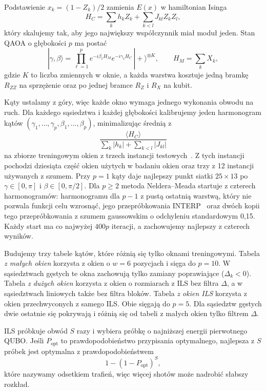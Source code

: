 \documentclass[runningheads]{llncs}
\begin{document}
Podstawienie $x_k = (1 - Z_k)/2$ zamienia $E(x)$ w hamiltonian Isinga
\begin{equation}
  H_C = \sum_k h_k Z_k + \sum_{k<l} J_{kl} Z_k Z_l ,
\end{equation}
który skalujemy tak,
aby jego największy współczynnik miał moduł jeden. Stan QAOA o głębokości
$p$ ma postać
\begin{equation}
  |\gamma,\beta\rangle = \prod_{\ell=1}^{p}
  e^{-i\beta_\ell H_M} e^{-i\gamma_\ell H_C} \, |{+}\rangle^{\otimes K},
  \qquad H_M = \sum_k X_k ,
\end{equation}
gdzie $K$ to liczba zmiennych w oknie, a każda warstwa kosztuje jedną bramkę
$R_{ZZ}$ na sprzężenie oraz po jednej bramce $R_Z$ i $R_X$ na kubit.

Kąty ustalamy z góry, więc każde okno wymaga jednego wykonania obwodu na
ruch. Dla każdego sąsiedztwa i każdej głębokości kalibrujemy jeden
harmonogram kątów $(\gamma_1, \dots, \gamma_p, \beta_1, \dots, \beta_p)$,
minimalizując średnią z
\begin{equation}
  \frac{\langle H_C \rangle}{\sum_k |h_k| + \sum_{k<l} |J_{kl}|}
\end{equation}
na zbiorze
treningowym okien z trzech instancji testowych~\cite{taillard1993}. Z tych instancji pochodzi dziesiąta część okien użytych w badaniu okien
oraz trzy z 12 instancji używanych z szumem. Przy $p = 1$ kąty daje najlepszy
punkt siatki $25 \times 13$ po $\gamma \in [0, \pi]$ i $\beta \in [0, \pi/2]$.
Dla $p \ge 2$ metoda Neldera--Meada startuje z czterech harmonogramów:
harmonogramu dla $p-1$ z pustą ostatnią warstwą, który nie pozwala funkcji
celu wzrosnąć, jego przepróbkowania INTERP~\cite{zhou2020} oraz dwóch kopii
tego przepróbkowania z szumem gaussowskim o odchyleniu standardowym 0{,}15.
Każdy start ma co najwyżej $400p$ iteracji, a zachowujemy najlepszy z czterech
wyników.

Budujemy trzy tabele kątów, które różnią się tylko oknami treningowymi.
Tabela \emph{z małych okien} korzysta z okien o $w = 6$ pozycjach i sięga do
$p = 10$. W sąsiedztwach gęstych te okna zachowują tylko zamiany poprawiające
($\Delta_k < 0$). Tabela \emph{z dużych okien} korzysta z okien o rozmiarach
z ILS bez filtra $\Delta$, a w sąsiedztwach liniowych także bez filtra
bloków. Tabela \emph{z okien ILS} korzysta z okien przechwyconych z samego
ILS. Obie sięgają do $p = 5$. Dla sąsiedztw gęstych dwie ostatnie się
pokrywają i różnią się od tabeli z małych okien tylko filtrem $\Delta$.

ILS próbkuje obwód $S$ razy i wybiera próbkę o najniższej energii
pierwotnego QUBO. Jeśli $P_{\mathrm{opt}}$ to prawdopodobieństwo przypisania optymalnego,
najlepsza z $S$ próbek jest optymalna z prawdopodobieństwem
\begin{equation}
  1 - (1 - P_{\mathrm{opt}})^S ,
\end{equation}
które nazywamy odsetkiem trafień, więc więcej
shotów może nadrobić słabszy rozkład.
\end{document}
